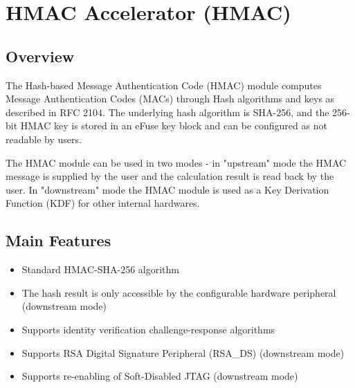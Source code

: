 \documentclass[main\_\_EN.tex]{subfiles}
\begin{document}

\ifglobal
\else
    {\let\clearpage\relax \listoftodos}
    {\let\clearpage\relax \listofdonetodos}
    \tableofcontents
\fi



\chapter{HMAC Accelerator (HMAC)}
\label{mod:hmac}
\hypertarget{hmac}{}

\section{Overview}
The Hash-based Message Authentication Code (HMAC) module computes Message Authentication Codes (MACs) through Hash algorithms and keys as described in RFC 2104. The underlying hash algorithm is SHA-256, and the 256-bit HMAC key is stored in an eFuse key block and can be configured as not readable by users.

The HMAC module can be used in two modes - in "upstream" mode the HMAC message is supplied by the user and the calculation result is read back by the user. In "downstream" mode the HMAC module is used as a Key Derivation Function (KDF) for other internal hardwares.

\section{Main Features}
\begin{itemize}
    \item Standard HMAC-SHA-256 algorithm
    \item The hash result is only accessible by the configurable hardware peripheral (downstream mode)
    \item Supports identity verification challenge-response algorithms
    \item Supports RSA Digital Signature Peripheral (RSA\_DS) (downstream mode)
    \item Supports re-enabling of Soft-Disabled JTAG (downstream mode)
\end{itemize}
\end{document}
